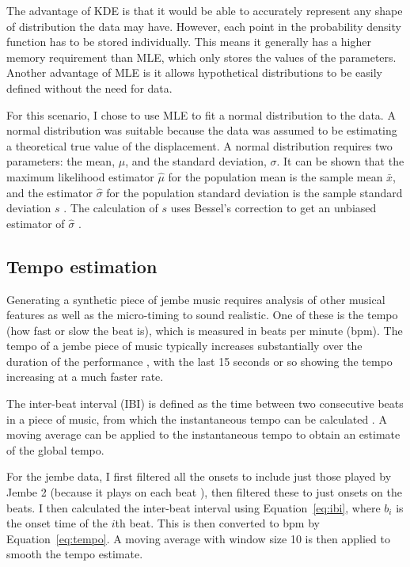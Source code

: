 \documentclass[12pt,twoside,openright]{report}
\begin{document}
The advantage of KDE is that it would be able to accurately represent any shape
of distribution the data may have. However, each point in
the probability density function has to be stored individually. This means it generally has a higher memory
requirement than MLE, which only stores the values of the parameters. Another
advantage of MLE is it allows hypothetical distributions to be easily defined
without the need for data.

For this scenario, I chose to use MLE to fit a normal distribution to the data.
A normal distribution was suitable because the data was assumed to be estimating
a theoretical true value of the displacement. A normal distribution requires two
parameters: the mean, $\mu$, and the standard deviation, $\sigma$. It can be shown that the maximum likelihood estimator $\hat{\mu}$ for the population mean is the sample mean $\bar{x}$, and the estimator $\hat{\sigma}$ for the population standard deviation is the sample standard deviation $s$ \cite{dekking2005}. The calculation of $s$ uses Bessel's
correction to get an unbiased estimator of $\hat{\sigma}$ \cite{upton2014}.


\subsection{Tempo estimation} \label{tempo_estimation}

Generating a synthetic piece of jembe music requires analysis of other musical
features as well as the micro-timing to sound realistic. One of these is the
tempo (how fast or slow the beat is), which is measured in beats per minute
(bpm). The tempo of a jembe piece of music typically increases substantially
over the duration of the performance \cite{jacoby2021}, with the last 15 seconds or
so showing the tempo increasing at a much faster rate.

The inter-beat interval (IBI) is defined as the time between two consecutive beats in a
piece of music, from which the instantaneous tempo can be calculated \cite{dixon2001}.
A moving average can be applied to the instantaneous tempo to obtain an estimate
of the global tempo.

For the jembe data, I first filtered all the onsets to include just those played
by Jembe 2 (because it plays on each beat \cite{jacoby2021}), then filtered these to
just onsets on the beats. I then calculated the inter-beat interval using Equation~\ref{eq:ibi}, where $b_i$ is the onset time of the $i$th beat. This is then converted to bpm by Equation~\ref{eq:tempo}. A moving average with window size 10 is then applied to smooth the tempo estimate.
\end{document}

